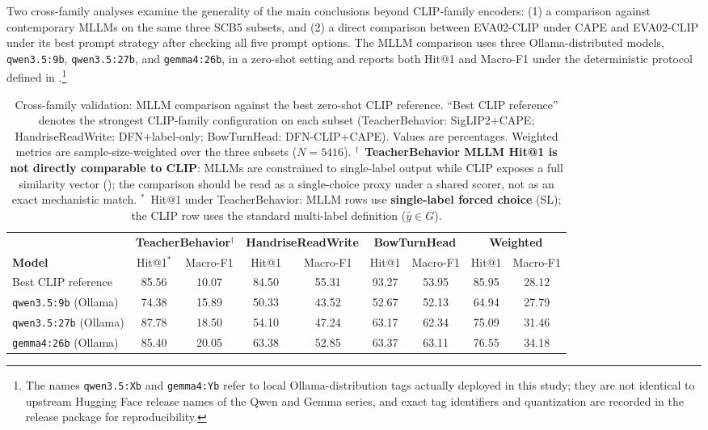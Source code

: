 \documentclass[symmetry,article,submit,pdftex,moreauthors]{Definitions/mdpi}
\begin{document}
Two cross-family analyses examine the generality of the main conclusions beyond CLIP-family encoders: (1) a comparison against contemporary MLLMs on the same three SCB5 subsets, and (2) a direct comparison between EVA02-CLIP under CAPE and EVA02-CLIP under its best prompt strategy after checking all five prompt options. The MLLM comparison uses three Ollama-distributed models, \texttt{qwen3.5:9b}, \texttt{qwen3.5:27b}, and \texttt{gemma4:26b}, in a zero-shot setting and reports both Hit@1 and Macro-F1 under the deterministic protocol defined in .\footnote{The names \texttt{qwen3.5:Xb} and \texttt{gemma4:Yb} refer to local Ollama-distribution tags actually deployed in this study; they are not identical to upstream Hugging Face release names of the Qwen and Gemma series, and exact tag identifiers and quantization are recorded in the release package for reproducibility.}

\begin{table}[H]
\caption{Cross-family validation: MLLM comparison against the best zero-shot CLIP reference. ``Best CLIP reference'' denotes the strongest CLIP-family configuration on each subset (TeacherBehavior: SigLIP2+CAPE; HandriseReadWrite: DFN+label-only; BowTurnHead: DFN-CLIP+CAPE). Values are percentages. Weighted metrics are sample-size-weighted over the three subsets ($N=5416$). $^{\dagger}$~\textbf{TeacherBehavior MLLM Hit@1 is not directly comparable to CLIP}: MLLMs are constrained to single-label output while CLIP exposes a full similarity vector (); the comparison should be read as a single-choice proxy under a shared scorer, not as an exact mechanistic match. $^{*}$~Hit@1 under TeacherBehavior: MLLM rows use \textbf{single-label forced choice} (SL); the CLIP row uses the standard multi-label definition ($\hat{y}\in G$).}
\label{tab:mllm_validation}
\centering
\small
\setlength{\tabcolsep}{3pt}
\begin{tabular}{l cc cc cc cc}
\toprule
 & \multicolumn{2}{c}{\textbf{TeacherBehavior}$^{\dagger}$} & \multicolumn{2}{c}{\textbf{HandriseReadWrite}} & \multicolumn{2}{c}{\textbf{BowTurnHead}} & \multicolumn{2}{c}{\textbf{Weighted}} \\
\cmidrule(lr){2-3}\cmidrule(lr){4-5}\cmidrule(lr){6-7}\cmidrule(lr){8-9}
\textbf{Model} & Hit@1$^{*}$ & Macro-F1 & Hit@1 & Macro-F1 & Hit@1 & Macro-F1 & Hit@1 & Macro-F1 \\
\midrule
Best CLIP reference & 85.56 & 10.07 & 84.50 & 55.31 & 93.27 & 53.95 & 85.95 & 28.12 \\
\texttt{qwen3.5:9b} (Ollama) & 74.38 & 15.89 & 50.33 & 43.52 & 52.67 & 52.13 & 64.94 & 27.79 \\
\texttt{qwen3.5:27b} (Ollama) & 87.78 & 18.50 & 54.10 & 47.24 & 63.17 & 62.34 & 75.09 & 31.46 \\
\texttt{gemma4:26b} (Ollama) & 85.40 & 20.05 & 63.38 & 52.85 & 63.37 & 63.11 & 76.55 & 34.18 \\
\bottomrule
\end{tabular}
\end{table}
\end{document}
